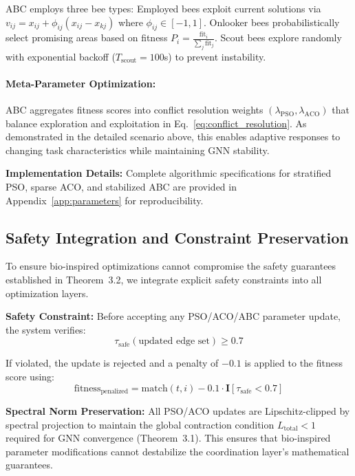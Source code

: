 \documentclass{article}
\begin{document}
ABC employs three bee types: Employed bees exploit current solutions via $v_{ij} = x_{ij} + \phi_{ij}(x_{ij} - x_{kj})$ where $\phi_{ij} \in [-1,1]$. Onlooker bees probabilistically select promising areas based on fitness $P_i = \frac{\text{fit}_i}{\sum_j \text{fit}_j}$. Scout bees explore randomly with exponential backoff ($T_{\text{scout}} = 100$s) to prevent instability.

\paragraph{Meta-Parameter Optimization:} ABC aggregates fitness scores into conflict resolution weights $(\lambda_{\text{PSO}}, \lambda_{\text{ACO}})$ that balance exploration and exploitation in Eq.~\eqref{eq:conflict_resolution}. As demonstrated in the detailed scenario above, this enables adaptive responses to changing task characteristics while maintaining GNN stability.

\textbf{Implementation Details:} Complete algorithmic specifications for stratified PSO, sparse ACO, and stabilized ABC are provided in Appendix~\ref{app:parameters} for reproducibility.

\subsection{Safety Integration and Constraint Preservation}

To ensure bio-inspired optimizations cannot compromise the safety guarantees established in Theorem~3.2, we integrate explicit safety constraints into all optimization layers.

\textbf{Safety Constraint:} Before accepting any PSO/ACO/ABC parameter update, the system verifies:
\begin{equation}
\tau_{\text{safe}}(\text{updated edge set}) \geq 0.7
\end{equation}

If violated, the update is rejected and a penalty of $-0.1$ is applied to the fitness score using:
\begin{equation}
\text{fitness}_{\text{penalized}} = \text{match}(t,i) - 0.1 \cdot \mathbf{I}[\tau_{\text{safe}} < 0.7]
\end{equation}

\textbf{Spectral Norm Preservation:} All PSO/ACO updates are Lipschitz-clipped by spectral projection to maintain the global contraction condition $L_{\text{total}} < 1$ required for GNN convergence (Theorem~3.1). This ensures that bio-inspired parameter modifications cannot destabilize the coordination layer's mathematical guarantees.
\end{document}
